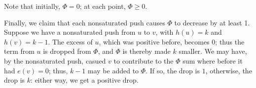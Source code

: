 \documentclass{article}
\begin{document}
Note that
initially, $\Phi = 0$; at each point, $\Phi \geq 0$.

Finally, we claim that each nonsaturated push causes $\Phi$ to 
decrease by at least 1.
Suppose we have a nonsaturated push from $u$ to $v$, with $h(u) = k$ and
$h(v) = k-1$.
The excess of $u$, which was positive before, becomes 0; thus the term
from $u$ is dropped from $\Phi$, and $\Phi$ is thereby made $k$ smaller.
We may have, by the nonsaturated push, casued $v$ to contribute to the
$\Phi$ sum where before it had $e(v) = 0$; thus, $k-1$ may be added to
$\Phi$. If so, the drop is $1$, otherwise, the drop is $k$: either way,
we get a positive drop.








%
%
%
%
%
%
%
%	
\end{document}
